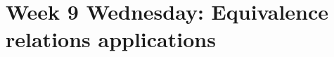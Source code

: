 \section*{Week 9 Wednesday: Equivalence relations applications}



\vfill

\vfill
\newpage



\newpage


\vfill
\newpage



\newpage
